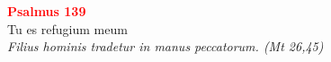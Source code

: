 


\def\greinitialformat#1{%
{\fontsize{39}{39}\selectfont #1}%
}




\vspace{0.3cm}
\begin{center}
 \textcolor{red}{\large \bf Psalmus 139}\\
Tu es refugium meum\\
\textit{\small Filius hominis tradetur in manus peccatorum. (Mt 26,45)}
\end{center}
